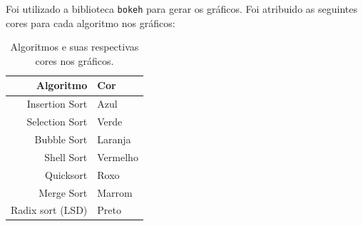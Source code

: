 

Foi utilizado a biblioteca \texttt{bokeh} para gerar os gráficos. Foi atribuido as seguintes cores para cada algoritmo nos gráficos:

\begin{table}[H]
 \centering
	\begin{tabular}{| r | l |}
		\hline
		\textbf{Algoritmo} & \textbf{Cor} \\
		\hline
		Insertion Sort   & Azul \\
		\hline
		Selection Sort   & Verde \\
		\hline
		Bubble Sort      & Laranja \\
		\hline
		Shell Sort       & Vermelho \\
		\hline
		Quicksort        & Roxo \\
		\hline
		Merge Sort       & Marrom \\
		\hline
		Radix sort (LSD) & Preto \\
		\hline
	\end{tabular}
	\caption{Algoritmos e suas respectivas cores nos gráficos.}
	\label{t_graph_color}
\end{table}